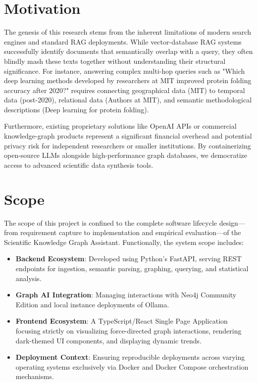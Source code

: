 \documentclass[12pt,a4paper]{report}
\begin{document}
\section{Motivation}
The genesis of this research stems from the inherent limitations of modern search engines and standard RAG deployments. While vector-database RAG systems successfully identify documents that semantically overlap with a query, they often blindly mash these texts together without understanding their structural significance. For instance, answering complex multi-hop queries such as "Which deep learning methods developed by researchers at MIT improved protein folding accuracy after 2020?" requires connecting geographical data (MIT) to temporal data (post-2020), relational data (Authors at MIT), and semantic methodological descriptions (Deep learning for protein folding). 

Furthermore, existing proprietary solutions like OpenAI APIs or commercial knowledge-graph products represent a significant financial overhead and potential privacy risk for independent researchers or smaller institutions. By containerizing open-source LLMs alongside high-performance graph databases, we democratize access to advanced scientific data synthesis tools.

\section{Scope}
The scope of this project is confined to the complete software lifecycle design—from requirement capture to implementation and empirical evaluation—of the Scientific Knowledge Graph Assistant. Functionally, the system scope includes:
\begin{itemize}
    \item \textbf{Backend Ecosystem}: Developed using Python's FastAPI, serving REST endpoints for ingestion, semantic parsing, graphing, querying, and statistical analysis.
    \item \textbf{Graph AI Integration}: Managing interactions with Neo4j Community Edition and local instance deployments of Ollama.
    \item \textbf{Frontend Ecosystem}: A TypeScript/React Single Page Application focusing strictly on visualizing force-directed graph interactions, rendering dark-themed UI components, and displaying dynamic trends.
    \item \textbf{Deployment Context}: Ensuring reproducible deployments across varying operating systems exclusively via Docker and Docker Compose orchestration mechanisms.
\end{itemize}
\end{document}
